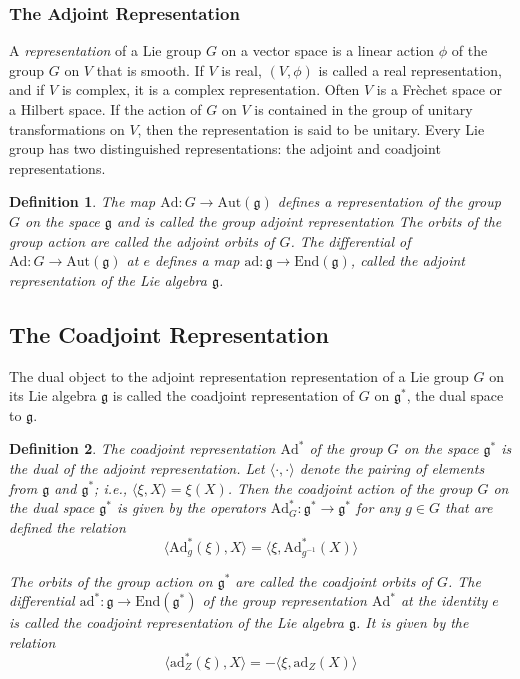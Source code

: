 \documentclass{article}
\newtheorem{defn}{Definition}
\begin{document}
\subsubsection{The Adjoint Representation}
\indent A \textit{representation} of a Lie group $G$ on a vector space is a linear action $\phi$ of the group $G$ on $V$ that is smooth. If $V$ is real, $(V, \phi)$ is called a real representation, and if $V$ is complex, it is a complex representation. Often $V$ is a Fr\`echet space or a Hilbert space. If the action of $G$ on $V$ is contained in the group of unitary transformations on $V$, then the representation is said to be unitary. 
\indent Every Lie group has two distinguished representations: the adjoint and coadjoint representations. \\


\begin{defn}

	The map $\mathrm{Ad}:G \to \mathrm{Aut}( \mathfrak{g})$ defines a representation of the group $G$ on the space $ \mathfrak{g}$ and is called the \textit{group adjoint representation} The orbits of the group action are called the \textit{adjoint orbits} of $G$. The differential of $ \mathrm{Ad}: G \to \mathrm{Aut}( \mathfrak{g})$ at $e$ defines a map $ \mathrm{ad}: \mathfrak{g} \to \mathrm{End}( \mathfrak{g})$, called the \textit{adjoint representation of the Lie algebra $ \mathfrak{g}$}.

\end{defn}

\subsection{The Coadjoint Representation}

\indent The dual object to the adjoint representation representation of a Lie group $G$ on its Lie algebra $ \mathfrak{g}$ is called the coadjoint representation of $G$ on $ \mathfrak{g}^*$, the dual space to $ \mathfrak{g}$. 


\begin{defn}

	The \textit{coadjoint representation} $\mathrm{Ad}^*$ of the group $G$ on the space $ \mathfrak{g}^*$ is the dual of the adjoint representation. Let $ \langle \cdot, \cdot \rangle$ denote the pairing of elements from $ \mathfrak{g}$ and $ \mathfrak{g}^*$; i.e., $ \langle \xi, X \rangle = \xi (X)$. Then the \textit{coadjoint action of the group} $G$ on the dual space $ \mathfrak{g}^*$ is given by the operators $ \mathrm{Ad}^*_G: \mathfrak{g}^* \to \mathfrak{g}^*$ for any $g \in G$ that are defined the relation
	\[\langle \mathrm{Ad}^*_g (\xi), X \rangle = \langle \xi, \mathrm{Ad}^*_{g^{-1}} (X) \rangle\]

The orbits of the group action on $ \mathfrak{g}^*$ are called the \textit{coadjoint orbits} of $G$.
\indent The differential $ \mathrm{ad}^*: \mathfrak{g} \to \mathrm{End}( \mathfrak{g}^* )$ of the group representation $ \mathrm{Ad}^*$ at the identity $e$ is called the \textit{coadjoint representation of the Lie algebra} $ \mathfrak{g}$. It is given by the relation
\[ \langle \mathrm{ad}^*_Z (\xi), X \rangle = - \langle \xi, \mathrm{ad}_Z (X) \rangle  \]
\end{defn}
\end{document}

